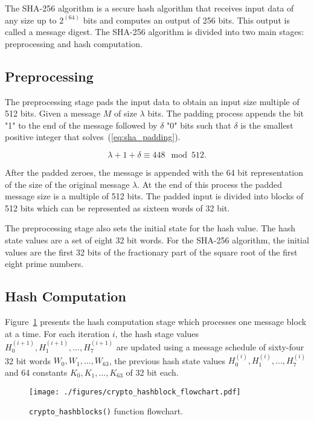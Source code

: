 The SHA-256 algorithm \cite{SHA_NIST_FIPS} is a secure hash algorithm that
receives input data of any size up to $2^(64)$ bits and computes an output of
256 bits. This output is called a message digest.
The SHA-256 algorithm is divided into two main stages: preprocessing and hash
computation.

\subsection{Preprocessing}
\label{subsec:preprocessing}
The preprocessing stage pads the input data to obtain an input size multiple of
512 bits. Given a message $M$ of size $\lambda$ bits. The padding process
appends the bit "1" to the end of the message followed by $\delta$ "0" bits
such that $\delta$ is the smallest positive integer that
solves~(\ref{eq:sha_padding}).

\begin{equation}
\lambda + 1 + \delta \equiv 448 \mod 512.
\label{eq:sha_padding}
\end{equation}

After the padded zeroes, the message is appended with the 64 bit representation
of the size of the original message $\lambda$. At the end of this process the 
padded message size is a multiple of 512 bits. The padded input is divided into
blocks of 512 bits which can be represented as sixteen words of 32 bit. 

The preprocessing stage also sets the initial state for the hash value. The hash
state values are a set of eight 32 bit words. For the SHA-256 algorithm, the
initial values are the first 32 bits of the fractionary part of the square root
of the first eight prime numbers.

\subsection{Hash Computation}
\label{subsec:hash_computation}

Figure~\ref{fig:hash_flowchart} presents the hash computation stage which
processes one message block at a time. For each iteration $i$, the hash stage
values $H_{0}^{(i+1)}, H_{1}^{(i+1)},..., H_{7}^{(i+1)}$ are updated using a
message schedule of sixty-four 32 bit words $W_0, W_1,..., W_{63}$, the previous hash
state values $H_{0}^{(i)}, H_{1}^{(i)},..., H_{7}^{(i)}$ and 64 constants 
$K_{0},K_{1},...,K_{63}$ of 32 bit each.

\begin{figure}[!htbp]
    \centerline{\texttt{[image: ./figures/crypto\_hashblock\_flowchart.pdf]}}
    \vspace{0cm}\caption{\texttt{crypto\_hashblocks()} function flowchart.}
    \label{fig:hash_flowchart}
\end{figure}

